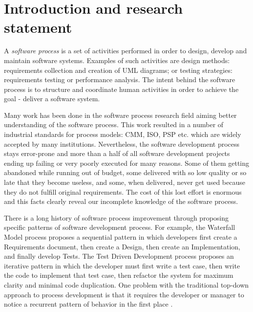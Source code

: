 \chapter{Introduction and research statement}
A \textit{software process} is a set of activities performed in order to design, develop and maintain software systems. Examples of such activities are design methods: requirements collection and creation of UML diagrams; or testing strategies: requirements testing or performance analysis. The intent behind the software process is to structure and coordinate human activities in order to achieve the goal - deliver a software system.

Many work has been done in the software process research field aiming better understanding of the software process. This work resulted in a number of industrial standards for process models: CMM, ISO, PSP etc. \cite{citeulike:5043104} which are widely accepted by many institutions. Nevertheless, the software development process stays error-prone and more than a half of all software development projects ending up failing or very poorly executed for many reasons. Some of them getting abandoned while running out of budget, some delivered with so low quality or so late that they become useless, and some, when delivered, never get used because they do not fulfill original requirements. The cost of this lost effort is enormous and this facts clearly reveal our incomplete knowledge of the software process.

There is a long history of software process improvement through proposing specific patterns of software development process. For example, the Waterfall Model process proposes a sequential pattern in which developers first create a Requirements document, then create a Design, then create an Implementation, and finally develop Tests. The Test Driven Development process proposes an iterative pattern in which the developer must first write a test case, then write the code to implement that test case, then refactor the system for maximum clarity and minimal code duplication. One problem with the traditional top-down approach to process development is that it requires the developer or manager to notice a recurrent pattern of behavior in the first place \cite{citeulike:5043104}. 

